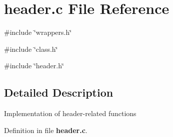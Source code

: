 \section{header.c File Reference}
\label{header_8c}
{\ttfamily \#include \char`\"{}wrappers.h\char`\"{}}\par
{\ttfamily \#include \char`\"{}class.h\char`\"{}}\par
{\ttfamily \#include \char`\"{}header.h\char`\"{}}\par


\subsection{Detailed Description}
Implementation of header-\/related functions 

Definition in file {\bf header.c}.

